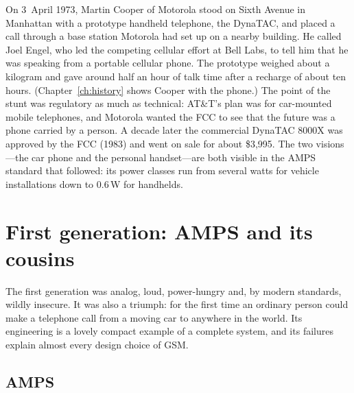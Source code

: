 \begin{history}
On 3~April 1973, Martin Cooper of Motorola stood on Sixth Avenue in Manhattan with a prototype
handheld telephone, the DynaTAC, and placed a call through a base station Motorola had set up on a
nearby building. He called Joel Engel, who led the competing cellular effort at Bell Labs, to tell
him that he was speaking from a portable cellular phone. The prototype weighed about a kilogram and
gave around half an hour of talk time after a recharge of about ten hours. (Chapter~\ref{ch:history}
shows Cooper with the phone.) The point of the stunt was regulatory as much as technical: AT\&T's
plan was for car-mounted mobile telephones, and Motorola wanted the FCC to see that the future was a
phone carried by a person. A decade later the commercial DynaTAC 8000X was approved by the FCC
(1983) and went on sale for about \$3,995. The two visions---the car phone and the personal
handset---are both visible in the AMPS standard that followed: its power classes run from several
watts for vehicle installations down to 0.6\,W for handhelds.
\end{history}

\section{First generation: AMPS and its cousins}
\label{sec:ch21:1g}

The first generation was analog, loud, power-hungry and, by modern standards, wildly insecure. It
was also a triumph: for the first time an ordinary person could make a telephone call from a moving
car to anywhere in the world. Its engineering is a lovely compact example of a complete system, and
its failures explain almost every design choice of GSM.

\subsection{AMPS}


